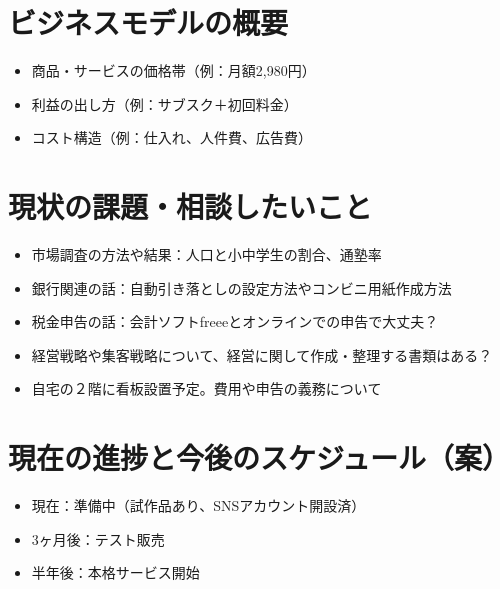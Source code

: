 ﻿\documentclass[12pt]{article}
\begin{document}
\section{ビジネスモデルの概要}
\begin{itemize}[leftmargin=1.5em]
  \item 商品・サービスの価格帯（例：月額2,980円）%
  \item 利益の出し方（例：サブスク＋初回料金）%
  \item コスト構造（例：仕入れ、人件費、広告費）%
\end{itemize}


\section{現状の課題・相談したいこと}
\begin{itemize}[leftmargin=1.5em]
  \item 市場調査の方法や結果：人口と小中学生の割合、通塾率
  \item 銀行関連の話：自動引き落としの設定方法やコンビニ用紙作成方法
  \item 税金申告の話：会計ソフトfreeeとオンラインでの申告で大丈夫？
  \item 経営戦略や集客戦略について、経営に関して作成・整理する書類はある？
  \item 自宅の２階に看板設置予定。費用や申告の義務について
\end{itemize}



\section{現在の進捗と今後のスケジュール（案）}
\begin{itemize}[leftmargin=1.5em]
  \item 現在：準備中（試作品あり、SNSアカウント開設済） %
  \item 3ヶ月後：テスト販売　%
  \item 半年後：本格サービス開始
\end{itemize}


\end{document}

